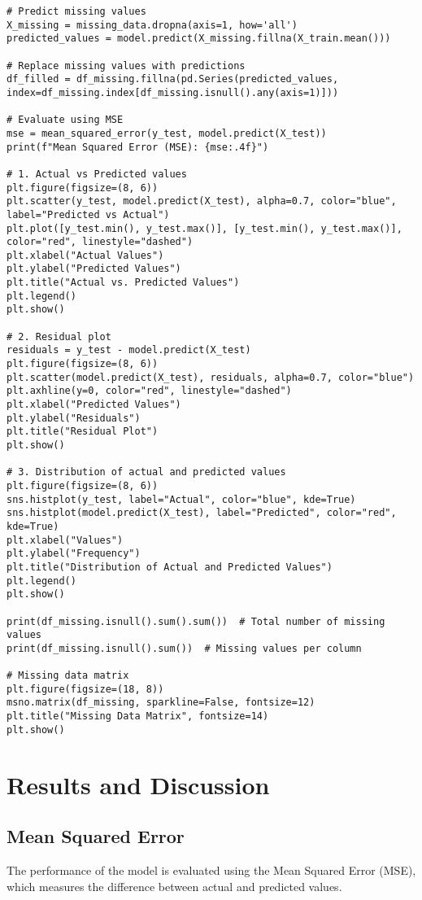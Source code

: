 \documentclass{article}
\begin{document}
\begin{verbatim}
# Predict missing values
X_missing = missing_data.dropna(axis=1, how='all')
predicted_values = model.predict(X_missing.fillna(X_train.mean()))

# Replace missing values with predictions
df_filled = df_missing.fillna(pd.Series(predicted_values, index=df_missing.index[df_missing.isnull().any(axis=1)]))

# Evaluate using MSE
mse = mean_squared_error(y_test, model.predict(X_test))
print(f"Mean Squared Error (MSE): {mse:.4f}")

# 1. Actual vs Predicted values
plt.figure(figsize=(8, 6))
plt.scatter(y_test, model.predict(X_test), alpha=0.7, color="blue", label="Predicted vs Actual")
plt.plot([y_test.min(), y_test.max()], [y_test.min(), y_test.max()], color="red", linestyle="dashed")
plt.xlabel("Actual Values")
plt.ylabel("Predicted Values")
plt.title("Actual vs. Predicted Values")
plt.legend()
plt.show()

# 2. Residual plot
residuals = y_test - model.predict(X_test)
plt.figure(figsize=(8, 6))
plt.scatter(model.predict(X_test), residuals, alpha=0.7, color="blue")
plt.axhline(y=0, color="red", linestyle="dashed")
plt.xlabel("Predicted Values")
plt.ylabel("Residuals")
plt.title("Residual Plot")
plt.show()

# 3. Distribution of actual and predicted values
plt.figure(figsize=(8, 6))
sns.histplot(y_test, label="Actual", color="blue", kde=True)
sns.histplot(model.predict(X_test), label="Predicted", color="red", kde=True)
plt.xlabel("Values")
plt.ylabel("Frequency")
plt.title("Distribution of Actual and Predicted Values")
plt.legend()
plt.show()

print(df_missing.isnull().sum().sum())  # Total number of missing values
print(df_missing.isnull().sum())  # Missing values per column

# Missing data matrix
plt.figure(figsize=(18, 8))
msno.matrix(df_missing, sparkline=False, fontsize=12)
plt.title("Missing Data Matrix", fontsize=14)
plt.show()
\end{verbatim}

\section{Results and Discussion}
\subsection{Mean Squared Error}
The performance of the model is evaluated using the Mean Squared Error (MSE), which measures the difference between actual and predicted values.
\end{document}

